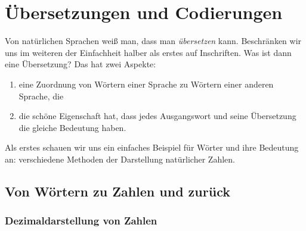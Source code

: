 \Tut\chapter{\"Ubersetzungen und Codierungen}
\label{k:codierungen}

Von natürlichen Sprachen weiß man, dass man \emph{übersetzen}
kann. Beschränken wir uns im weiteren der Einfachheit halber als
erstes auf Inschriften. Was ist dann eine Übersetzung? Das hat zwei
Aspekte:
\begin{enumerate}
\item eine Zuordnung von Wörtern einer Sprache zu Wörtern einer
  anderen Sprache, die
\item die schöne Eigenschaft hat, dass jedes Ausgangswort und
  seine Übersetzung die gleiche Bedeutung haben.
\end{enumerate}
%
Als erstes schauen wir uns ein einfaches Beispiel für Wörter und ihre
Bedeutung an: verschiedene Methoden der Darstellung natürlicher
Zahlen.

\Tut\section{Von W\"ortern zu Zahlen und zur\"uck}

\Tut\subsection{Dezimaldarstellung von Zahlen}

